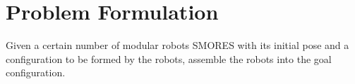 \section{Problem Formulation}\label{pf}

Given a certain number of modular robots SMORES with its initial pose and a configuration to be formed by the robots, assemble the robots into the goal configuration.